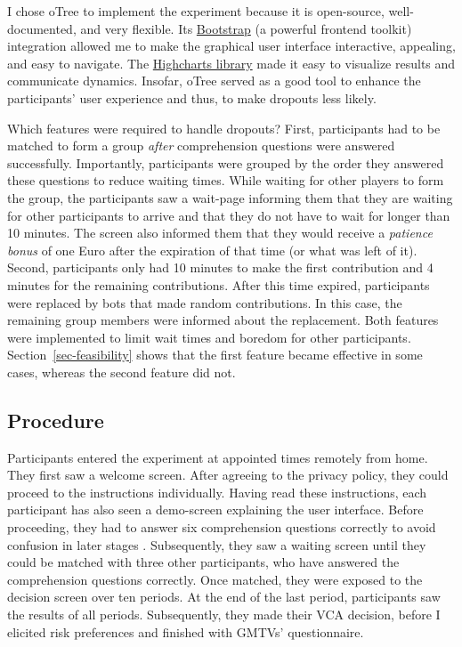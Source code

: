\documentclass[
  authoryear,
  review,
  3p,
  onecolumn]{elsarticle}
\begin{document}
I chose oTree \citep{oTree} to implement the experiment because it is
open-source, well-documented, and very flexible. Its
\href{https://getbootstrap.com/}{Bootstrap} (a powerful frontend
toolkit) integration allowed me to make the graphical user interface
interactive, appealing, and easy to navigate. The
\href{https://www.highcharts.com/}{Highcharts library} made it easy to
visualize results and communicate dynamics. Insofar, oTree served as a
good tool to enhance the participants' user experience and thus, to make
dropouts less likely.

Which features were required to handle dropouts? First, participants had
to be matched to form a group \emph{after} comprehension questions were
answered successfully. Importantly, participants were grouped by the
order they answered these questions to reduce waiting times. While
waiting for other players to form the group, the participants saw a
wait-page informing them that they are waiting for other participants to
arrive and that they do not have to wait for longer than 10 minutes. The
screen also informed them that they would receive a \emph{patience
bonus} of one Euro after the expiration of that time (or what was left
of it). Second, participants only had 10 minutes to make the first
contribution and 4 minutes for the remaining contributions. After this
time expired, participants were replaced by bots that made random
contributions. In this case, the remaining group members were informed
about the replacement. Both features were implemented to limit wait
times and boredom for other participants. Section~\ref{sec-feasibility}
shows that the first feature became effective in some cases, whereas the
second feature did not.

\hypertarget{sec-procedure}{%
\subsection{Procedure}\label{sec-procedure}}

Participants entered the experiment at appointed times remotely from
home. They first saw a welcome screen. After agreeing to the privacy
policy, they could proceed to the instructions individually. Having read
these instructions, each participant has also seen a demo-screen
explaining the user interface. Before proceeding, they had to answer six
comprehension questions correctly to avoid confusion in later stages
\citep{FerraroVossler2010}. Subsequently, they saw a waiting screen
until they could be matched with three other participants, who have
answered the comprehension questions correctly. Once matched, they were
exposed to the decision screen over ten periods. At the end of the last
period, participants saw the results of all periods. Subsequently, they
made their VCA decision, before I elicited risk preferences
\citep{HoltLaury2002} and finished with GMTVs' questionnaire.
\end{document}
